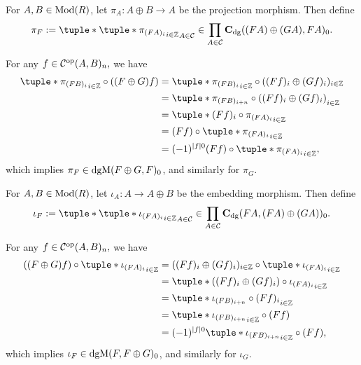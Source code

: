 \begin{remark}
    \label{rem:dgm_pi_iota}
    For \( A, B \in \operatorname{Mod}(R) \), let \( \pi_A: A \oplus B \to A \) be the projection morphism. Then define
    \[
        \pi_F := \tuple*{ \tuple*{ \pi_{(F A)_i} }_{i \in \Zb} }_{A \in \Cc} \in \prod_{A \in \Cc} \C_{\dg}((F A) \oplus (G A), F A)_0.
    \]

    For any \( f \in {\mathcal{C}}^{\operatorname{op}}(A, B)_n, \) we have
    \begin{align*}
        \tuple*{ \pi_{(F B)_i} }_{i \in \Zb} \circ ((F \oplus G) f) &= \tuple*{ \pi_{(F B)_i} }_{i \in \Zb} \circ ((F f)_i \oplus (G f)_i)_{i \in \Zb} \\
        &= \tuple*{ \pi_{(F B)_{i + n}} \circ ((F f)_i \oplus (G f)_i) }_{i \in \Zb} \\
        &= \tuple*{ (F f)_i \circ \pi_{(F A)_i} }_{i \in \Zb} \\
        &= (F f) \circ \tuple*{ \pi_{(F A)_i} }_{i \in \Zb} \\
        &= (-1)^{|f| 0}(F f) \circ \tuple*{ \pi_{(F A)_i} }_{i \in \Zb}, \\
    \end{align*}
    which implies \( \pi_F \in \operatorname{dgM}(F \oplus G, F)_0 \), and similarly for \( \pi_G \).

    For \( A, B \in \operatorname{Mod}(R) \), let \( \iota_A: A \to A \oplus B \) be the embedding morphism. Then define
    \[
        \iota_F := \tuple*{ \tuple*{ \iota_{(F A)_i} }_{i \in \Zb} }_{A \in \Cc} \in \prod_{A \in \Cc} \C_{\dg}(F A, (F A) \oplus (G A) )_0.
    \]

    For any \( f \in {\mathcal{C}}^{\operatorname{op}}(A, B)_n, \) we have
    \begin{align*}
        ((F \oplus G) f) \circ \tuple*{ \iota_{(F A)_i} }_{i \in \Zb} &= ((F f)_i \oplus (G f)_i)_{i \in \Zb} \circ \tuple*{ \iota_{(F A)_i} }_{i \in \Zb} \\
        &= \tuple*{ ((F f)_i \oplus (G f)_i) \circ \iota_{(F A)_i} }_{i \in \Zb} \\
        &= \tuple*{ \iota_{(F B)_{i + n}} \circ (F f)_i  }_{i \in \Zb} \\
        &= \tuple*{ \iota_{(F B)_{i + n}} }_{i \in \Zb} \circ (F f) \\
        &= (-1)^{|f| 0}\tuple*{ \iota_{(F B)_{i + n}} }_{i \in \Zb} \circ (F f), \\
    \end{align*}
    which implies \( \iota_F \in \operatorname{dgM}(F, F \oplus G)_0 \), and similarly for \( \iota_G \).


\end{remark}
